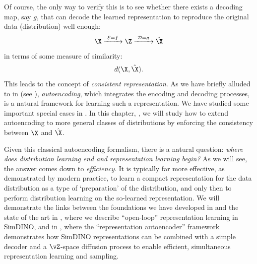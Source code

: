 \documentclass[../../book-main.tex]{subfiles}
\begin{document}
Of course, the only way to verify this is to see whether there exists a decoding map, say $g$, that can decode the learned representation to reproduce the original data (distribution) well enough:
\begin{equation}
  \X
  \xrightarrow{\hspace{1mm} \mathcal{E} = f \hspace{1mm}} \Z
  \xrightarrow{\hspace{1mm} \mathcal{D} = g \hspace{1mm}} \hat{\X}
\end{equation}
in terms of some measure of similarity:
\begin{equation}
  d(\X, \hat \X).
\end{equation}
This leads to the concept of {\em consistent representation}. As we have briefly alluded to in
 (see ), {\em autoencoding}, which integrates the
encoding and decoding processes, is a natural framework for learning such a representation. We have studied some important special cases in . In
this chapter, , we will study how to extend autoencoding to more general classes of distributions by enforcing the consistency between $\X$ and $\hat \X$.

Given this classical autoencoding formalism, there is a natural question:
\textit{where does distribution learning end and representation learning begin?}
As we will see, the answer %
comes down to \textit{efficiency}. It is typically far more
effective, as demonstrated by modern practice, to learn a compact representation
for the data distribution as a type of `preparation' of the distribution,
and only then to perform distribution learning on the so-learned representation.
We will demonstrate the links between the foundations we have developed in
 and the state of
the art in , where we describe ``open-loop'' representation learning
in SimDINO, and in , where the ``representation autoencoder''
framework demonstrates how SimDINO representations can be combined with
a simple decoder and a $\vZ$-space diffusion process to enable efficient,
simultaneous representation learning and sampling.
\end{document}

